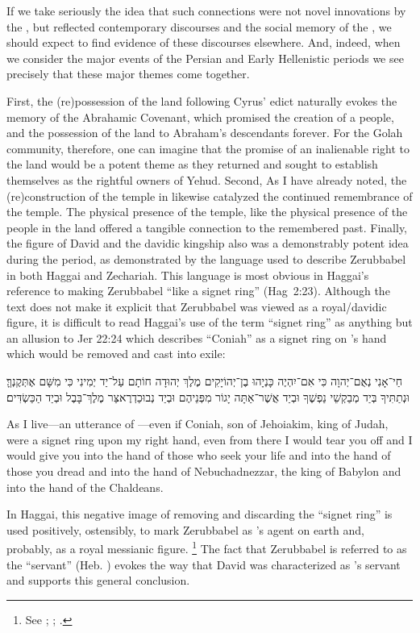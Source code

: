 If we take seriously the idea that such connections were not novel innovations by the \chronicler, but reflected contemporary discourses and the social memory of the \chronicler, we should expect to find evidence of these discourses elsewhere. And, indeed, when we consider the major events of the Persian and Early Hellenistic periods we see precisely that these major themes come together.

First, the (re)possession of the land following Cyrus' edict naturally evokes the memory of the Abrahamic Covenant, which promised the creation of a people, and the possession of the land to Abraham's descendants forever. For the Golah community, therefore, one can imagine that the promise of an inalienable right to the land would be a potent theme as they returned and sought to establish themselves as the rightful owners of Yehud. Second, As I have already noted, the (re)construction of the temple in  likewise catalyzed the continued remembrance of the temple. The physical presence of the temple, like the physical presence of the people in the land offered a tangible connection to the remembered past. Finally, the figure of David and the davidic kingship also was a demonstrably potent idea during the \secondtemple period, as demonstrated by the language used to describe Zerubbabel in both Haggai and Zechariah. This language is most obvious in Haggai's reference to \yahweh making Zerubbabel ``like a signet ring'' (Hag~2:23). Although the text does not make it explicit that Zerubbabel was viewed as a royal/davidic figure, it is difficult to read Haggai's use of the term ``signet ring'' as anything but an allusion to Jer 22:24 which describes ``Coniah'' as a signet ring on \yahweh's hand which would be removed and cast into exile:
\begin{hebrewtext}
    חַי־אָנִי נְאֻם־יְהוָה כִּי אִם־יִהְיֶה כָּנְיָהוּ בֶן־יְהוֹיָקִים מֶלֶךְ יְהוּדָה חוֹתָם עַל־יַד יְמִינִי כִּי מִשָּׁם אֶתְּקֶנְךָּ׃ 
    וּנְתַתִּיךָ בְּיַד מְבַקְשֵׁי נַפְשֶׁךָ וּבְיַד אֲשֶׁר־אַתָּה יָגוֹר מִפְּנֵיהֶם וּבְיַד נְבוּכַדְרֶאצַּר מֶלֶךְ־בָּבֶל וּבְיַד הַכַּשְׂדִּים׃
\end{hebrewtext}
\begin{translation}
    As I live---an utterance of \yahweh---even if Coniah, son of Jehoiakim, king of Judah, were a signet ring upon my right hand, even from there I would tear you off
    and I would give you into the hand of those who seek your life and into the hand of those you dread and into the hand of Nebuchadnezzar, the king of Babylon and into the hand of the Chaldeans.
\end{translation}
\noindent
In Haggai, this negative image of \yahweh removing and discarding the ``signet ring'' is used positively, ostensibly, to mark Zerubbabel as \yahweh's agent on earth and, probably, as a royal messianic figure.%
    \footnote{See
        \cite[71--103]{blenkinsopp2013};
        \cite[2:281--284]{vonrad1962};
        \cite[187]{redditt_interpretation2007}.}
The fact that Zerubbabel is referred to as the ``servant'' (Heb. ) evokes the way that David was characterized as \yahweh's servant and supports this general conclusion.

